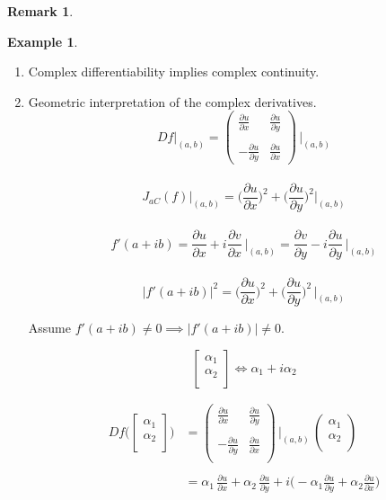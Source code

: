 \documentclass[11pt,a4paper]{article}
\theoremstyle{definition}
\newtheorem{example}[thm]{Example}
\newtheorem{remark}[thm]{Remark}
\begin{document}
\begin{remark}
\begin{example}
\begin{enumerate}
\item Complex differentiability implies complex continuity.
\item Geometric interpretation of the complex derivatives.
$$Df\Big|_{(a,b)}  = \begin{pmatrix}
\frac{\partial u}{\partial x} & \frac{\partial u}{\partial y}\\\\
-\frac{\partial u}{\partial y} & \frac{\partial u}{\partial x}
\end{pmatrix}\,\Bigg|_{(a,b)}$$\\


$$J_{aC}(f) \Big|_{(a,b)}= \Bigg(\frac{\partial u}{\partial x}\Bigg)^2 + \Bigg(\frac{\partial u}{\partial y}\Bigg)^2\Bigg|_{(a,b)}$$\\



$$f'(a  + ib) = \frac{\partial u}{\partial x} + i \frac{\partial v}{\partial x}\,\Bigg|_{(a,b)} = \frac{\partial v}{\partial y} - i\frac{\partial u}{\partial y}\,\Bigg|_{(a,b)}$$\\




$$\left|f'(a + ib)\right|^2 = \Bigg(\frac{\partial u}{\partial x}\Bigg)^2 + \Bigg(\frac{\partial u}{\partial y}\Bigg)^2 \,\Bigg|_{(a,b)}$$

Assume $f'(a + ib) \neq 0 \implies \left|f'(a + ib)\right| \neq 0$.

$$\begin{bmatrix}
\alpha_1\\
\alpha_2\\
\end{bmatrix} \iff \alpha_1 + i\alpha_2$$


\begin{align*}
Df \Bigg(\begin{bmatrix}
\alpha_1\\
\alpha_2\\
\end{bmatrix}\Bigg) & = \begin{pmatrix}
\frac{\partial u }{\partial x} & \frac{\partial u}{\partial y}\\\\
-\frac{\partial u }{\partial y} & \frac{\partial u}{\partial x}\\
\end{pmatrix}\,\Bigg|_{(a,b)}\,\begin{pmatrix}
\alpha_1\\
\alpha_2\\
\end{pmatrix}\\\\
& = \alpha_1\,\frac{\partial u}{\partial x} + \alpha_2\,\frac{\partial u}{\partial y} + i \Big(-\alpha_1\frac{\partial u}{\partial y} + \alpha_2\frac{\partial u}{\partial x}\Big)\\
\end{align*}


\end{enumerate}
\end{example}
\end{remark}
\end{document}
